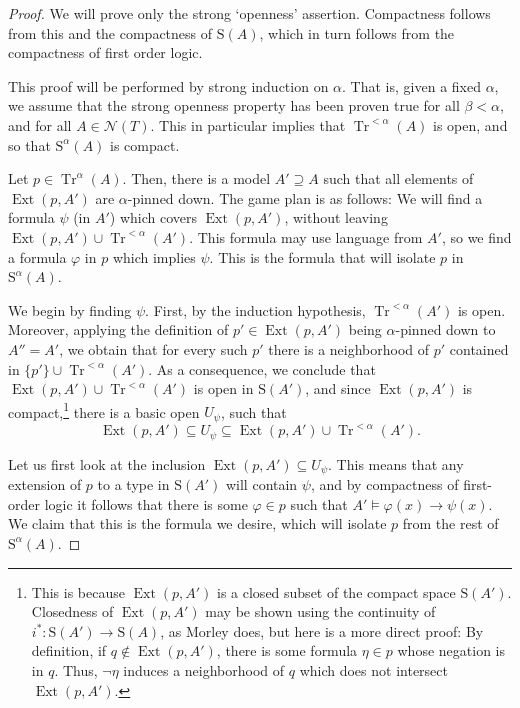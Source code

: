 \documentclass{article}
\theoremstyle{nonumberplain}
\newtheorem{proof}{Proof}
\newcommand{\calN}{\mathcal{N}}
\newcommand{\Stone}{\mathrm{S}}
\DeclareMathOperator{\Tr}{Tr}
\DeclareMathOperator{\Ext}{Ext}
\begin{document}
\begin{proof}
We will prove only the strong `openness' assertion. Compactness follows from this and the compactness of $\Stone(A)$, which in turn follows from the compactness of first order logic.

This proof will be performed by strong induction on $\alpha$. That is, given a fixed $\alpha$, we assume that the strong openness property has been proven true for all $\beta < \alpha$, and for all $A \in \calN(T)$. This in particular implies that $\Tr^{<\alpha}(A)$ is open, and so that $\Stone^\alpha(A)$ is compact.

Let $p \in \Tr^\alpha(A)$. Then, there is a model $A' \supseteq A$ such that all elements of $\Ext(p, A')$ are $\alpha$-pinned down. The game plan is as follows: We will find a formula $\psi$ (in $A'$) which covers $\Ext(p,A')$, without leaving $\Ext(p,A') \cup \Tr^{<\alpha}(A')$. This formula may use language from $A'$, so we find a formula $\varphi$ in $p$ which implies $\psi$. This is the formula that will isolate $p$ in $\Stone^\alpha(A)$.

We begin by finding $\psi$. First, by the induction hypothesis, $\Tr^{<\alpha}(A')$ is open. Moreover, applying the definition of $p' \in \Ext(p,A')$ being $\alpha$-pinned down to $A'' = A'$, we obtain that for every such $p'$ there is a neighborhood of $p'$ contained in $\{p'\} \cup \Tr^{<\alpha}(A')$. As a consequence, we conclude that $\Ext(p,A') \cup \Tr^{<\alpha}(A')$ is open in $\Stone(A')$, and since $\Ext(p,A')$ is compact,\footnote{This is because $\Ext(p,A')$ is a closed subset of the compact space $\Stone(A')$. Closedness of $\Ext(p,A')$ may be shown using the continuity of $i^* \colon \Stone(A') \to \Stone(A)$, as Morley does, but here is a more direct proof: By definition, if $q \not\in \Ext(p,A')$, there is some formula $\eta \in p$ whose negation is in $q$. Thus, $\neg\eta$ induces a neighborhood of $q$ which does not intersect $\Ext(p,A')$.} there is a basic open $U_\psi$, such that
\begin{equation}
\Ext(p,A') \subseteq U_\psi \subseteq \Ext(p,A') \cup \Tr^{<\alpha}(A').
\end{equation}

Let us first look at the inclusion $\Ext(p,A') \subseteq U_\psi$. This means that any extension of $p$ to a type in $\Stone(A')$ will contain $\psi$, and by compactness of first-order logic it follows that there is some $\varphi \in p$ such that $A' \vDash \varphi(x) \rightarrow \psi(x)$. We claim that this is the formula we desire, which will isolate $p$ from the rest of $\Stone^\alpha(A)$.


\end{proof}
\end{document}
